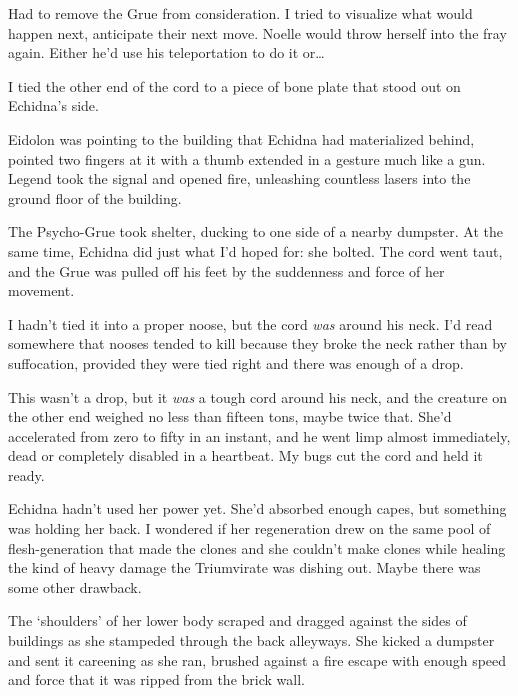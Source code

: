 Had to remove the Grue from consideration.  I tried to visualize what would happen next, anticipate their next move.  Noelle would throw herself into the fray again.  Either he'd use his teleportation to do it or\ldots



I tied the other end of the cord to a piece of bone plate that stood out on Echidna's side.



Eidolon was pointing to the building that Echidna had materialized behind, pointed two fingers at it with a thumb extended in a gesture much like a gun.  Legend took the signal and opened fire, unleashing countless lasers into the ground floor of the building.



The Psycho-Grue took shelter, ducking to one side of a nearby dumpster.  At the same time, Echidna did just what I'd hoped for: she bolted.  The cord went taut, and the Grue was pulled off his feet by the suddenness and force of her movement.



I hadn't tied it into a proper noose, but the cord \emph{was} around his neck.  I'd read somewhere that nooses tended to kill because they broke the neck rather than by suffocation, provided they were tied right and there was enough of a drop.



This wasn't a drop, but it \emph{was} a tough cord around his neck, and the creature on the other end weighed no less than fifteen tons, maybe twice that.  She'd accelerated from zero to fifty in an instant, and he went limp almost immediately, dead or completely disabled in a heartbeat.  My bugs cut the cord and held it ready.



Echidna hadn't used her power yet.  She'd absorbed enough capes, but something was holding her back.  I wondered if her regeneration drew on the same pool of flesh-generation that made the clones and she couldn't make clones while healing the kind of heavy damage the Triumvirate was dishing out.  Maybe there was some other drawback.



The `shoulders' of her lower body scraped and dragged against the sides of buildings as she stampeded through the back alleyways.  She kicked a dumpster and sent it careening as she ran, brushed against a fire escape with enough speed and force that it was ripped from the brick wall.



